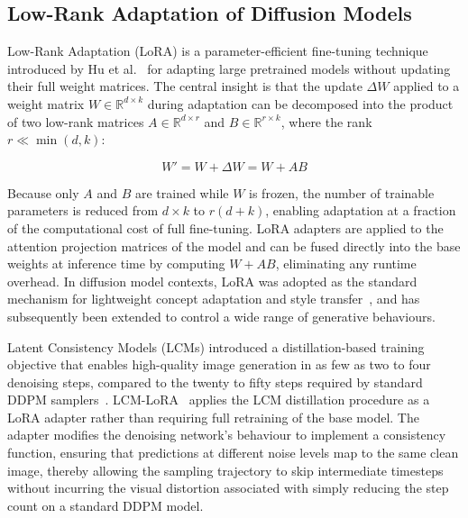 \subsection{Low-Rank Adaptation of Diffusion Models}

Low-Rank Adaptation (LoRA) is a parameter-efficient fine-tuning technique
introduced by Hu et al.~\cite{Hu_2021_LoRA} for adapting large pretrained
models without updating their full weight matrices. The central insight is
that the update $\Delta W$ applied to a weight matrix $W \in \mathbb{R}^{d
	\times k}$ during adaptation can be decomposed into the product of two
low-rank matrices $A \in \mathbb{R}^{d \times r}$ and $B \in \mathbb{R}^{r
	\times k}$, where the rank $r \ll \min(d, k)$:

\[
W' = W + \Delta W = W + AB
\]

Because only $A$ and $B$ are trained while $W$ is frozen, the number of
trainable parameters is reduced from $d \times k$ to $r(d + k)$, enabling
adaptation at a fraction of the computational cost of full fine-tuning.
LoRA adapters are applied to the attention projection matrices of the model
and can be fused directly into the base weights at inference time by
computing $W + AB$, eliminating any runtime overhead. In diffusion model
contexts, LoRA was adopted as the standard mechanism for lightweight
concept adaptation and style transfer~\cite{Hu_2021_LoRA}, and has
subsequently been extended to control a wide range of generative
behaviours.

Latent Consistency Models (LCMs) introduced a distillation-based training
objective that enables high-quality image generation in as few as two to
four denoising steps, compared to the twenty to fifty steps required by
standard DDPM samplers~\cite{Song_2023_LCM}. LCM-LoRA~\cite{Luo_2023_LCMLoRA}
applies the LCM distillation procedure as a LoRA adapter rather than
requiring full retraining of the base model. The adapter modifies the
denoising network's behaviour to implement a consistency function, ensuring
that predictions at different noise levels map to the same clean image,
thereby allowing the sampling trajectory to skip intermediate timesteps
without incurring the visual distortion associated with simply reducing the
step count on a standard DDPM model.

